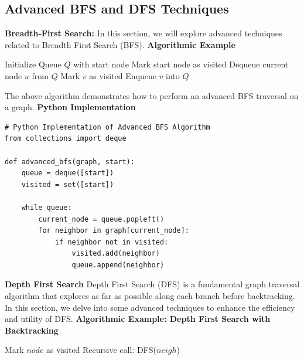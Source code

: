 \documentclass[12pt]{book} %
\begin{document}
\subsection{Advanced BFS and DFS Techniques}
\textbf{Breadth-First Search:}
\FloatBarrier
In this section, we will explore advanced techniques related to Breadth First Search (BFS).
\FloatBarrier
\textbf{Algorithmic Example}
\FloatBarrier
\begin{algorithm}
\caption{Advanced BFS Algorithm}
\begin{algorithmic}[1]
\State Initialize Queue $Q$ with start node
\State Mark start node as visited
    \State Dequeue current node $u$ from $Q$
            \State Mark $v$ as visited
            \State Enqueue $v$ into $Q$
        \EndIf
    \EndFor
\EndWhile
\end{algorithmic}
\end{algorithm}
\FloatBarrier
The above algorithm demonstrates how to perform an advanced BFS traversal on a graph.
\FloatBarrier
\textbf{Python Implementation}
\FloatBarrier
\begin{lstlisting}
# Python Implementation of Advanced BFS Algorithm
from collections import deque

def advanced_bfs(graph, start):
    queue = deque([start])
    visited = set([start])

    while queue:
        current_node = queue.popleft()
        for neighbor in graph[current_node]:
            if neighbor not in visited:
                visited.add(neighbor)
                queue.append(neighbor)
\end{lstlisting}
\FloatBarrier
\textbf{Depth First Search}
\FloatBarrier
Depth First Search (DFS) is a fundamental graph traversal algorithm that explores as far as possible along each branch before backtracking. In this section, we delve into some advanced techniques to enhance the efficiency and utility of DFS.
\FloatBarrier
\textbf{Algorithmic Example: Depth First Search with Backtracking}
\FloatBarrier
\begin{algorithm}
    \caption{DFS with Backtracking}
    \begin{algorithmic}[1]
            \State Mark $node$ as visited
                    \State Recursive call: \textsc{DFS}($neigh$)
                \EndIf
            \EndFor
        \EndFunction
    \end{algorithmic}
\end{algorithm}
\end{document}
